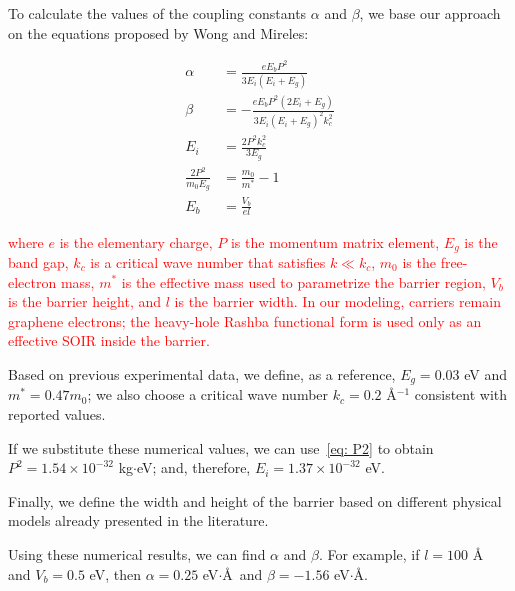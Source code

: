 To calculate the values of the coupling constants $\alpha$ and $\beta$, we base our approach on the equations proposed by Wong and Mireles\cite{WongUNAM2005}:

\begin{align}
    \alpha &= \frac{eE_b P^2}{3E_i\left( E_i + E_g \right)}\label{eq: alfa}\\
    \beta &= -\frac{eE_b P^2\left( 2E_i + E_g \right)}{3E_i\left( E_i + E_g \right)^2 k_c^2}\label{eq: beta}\\
    E_i &= \frac{2P^2 k_c^2}{3E_g} \label{eq: E_i}\\
    \frac{2P^2}{m_0 E_g} &= \frac{m_0}{m^*} - 1 \label{eq: P2}\\
    E_b &= \frac{V_b}{el} \label{eq: E_b}
\end{align}

\noindent \textcolor{red}{where $e$ is the elementary charge, $P$ is the momentum matrix element, $E_g$ is the band gap, $k_c$ is a critical wave number that satisfies $k \ll k_c$, $m_0$ is the free-electron mass, $m^*$ is the effective mass used to parametrize the barrier region, $V_b$ is the barrier height, and $l$ is the barrier width.
In our modeling, carriers remain graphene electrons; the heavy-hole Rashba functional form is used only as an effective SOIR inside the barrier.}

Based on previous experimental data\cite{HuntSci2013, FuhrerSci2013, PallaBullMaterSci2016}, we define, as a reference, $E_g = 0.03$ eV and $m^* = 0.47m_0$; we also choose a critical wave number $k_c = 0.2$ \AA$^{-1}$ consistent with reported values.

If we substitute these numerical values, we can use~\eqref{eq: P2} to obtain $P^2=1.54\times10^{-32}$ kg$\cdot$eV; and, therefore, $E_i = 1.37\times10^{-32}$ eV\@.

Finally, we define the width and height of the barrier based on different physical models already presented in the literature.

Using these numerical results, we can find $\alpha$ and $\beta$.
For example, if $l=100$ \AA\, and $V_b = 0.5$ eV, then $\alpha = 0.25$ eV$\cdot$\AA\, and $\beta = -1.56$ eV$\cdot$\AA.


